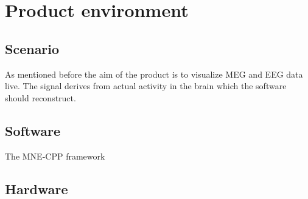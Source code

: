 \section {Product environment}
\subsection{Scenario}
As mentioned before the aim of the product is to visualize MEG and EEG data live. The signal derives from actual activity in the brain which the software should reconstruct. 


\subsection{Software}
The MNE-CPP framework 
\subsection{Hardware}